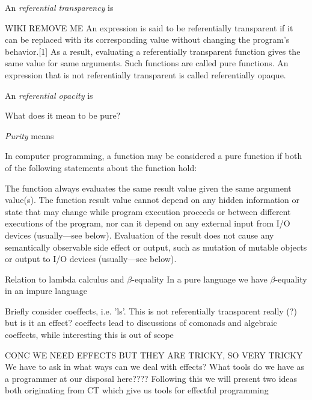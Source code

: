 \begin{definition}
    An \textit{referential transparency} is
\end{definition}
WIKI REMOVE ME
An expression is said to be referentially transparent if it can be replaced with its corresponding value without changing the program's behavior.[1] As a result, evaluating a referentially transparent function gives the same value for same arguments. Such functions are called pure functions. An expression that is not referentially transparent is called referentially opaque.
\begin{definition}
    An \textit{referential opacity} is
\end{definition}

What does it mean to be pure?
\begin{definition}
    \textit{Purity} means


    In computer programming, a function may be considered a pure function if both of the following statements about the function hold:

The function always evaluates the same result value given the same argument value(s). The function result value cannot depend on any hidden information or state that may change while program execution proceeds or between different executions of the program, nor can it depend on any external input from I/O devices (usually—see below).
Evaluation of the result does not cause any semantically observable side effect or output, such as mutation of mutable objects or output to I/O devices (usually—see below).

\end{definition}

Relation to lambda calculus and $\beta$-equality
In a pure language we have $\beta$-equality
in an impure language 


Briefly consider coeffects, i.e. 'ls'.
This is not referentially transparent really (?)
but is it an effect?
coeffects lead to discussions of comonads and algebraic coeffects,
while interesting this is out of scope
\cite{coeffects-icalp13}
\cite{petricek2014coeffects}



CONC WE NEED EFFECTS BUT THEY ARE TRICKY, SO VERY TRICKY
We have to ask in what ways can we deal with effects?
What tools do we have as a programmer at our disposal here????
Following this we will present two ideas both originating from CT
which give us tools for effectful programming
